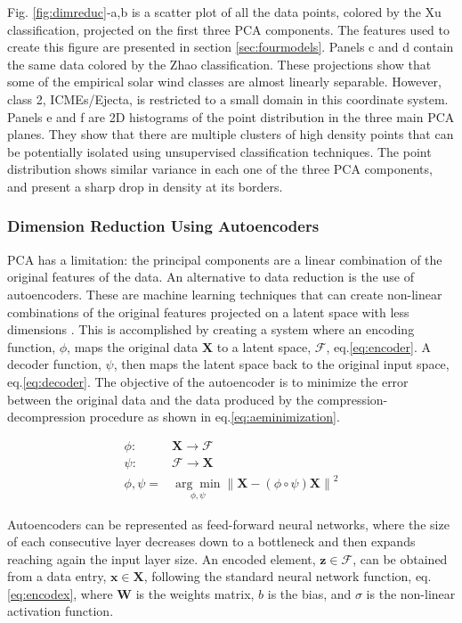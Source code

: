 Fig. \ref{fig:dimreduc}-a,b is a scatter plot of all the data points, colored by the Xu classification, projected on the first three PCA components. The features used to create this figure are presented in section \ref{sec:fourmodels}. Panels c and d contain the same data colored by the Zhao classification. These projections show that some of the empirical solar wind classes are almost linearly separable. However, class 2, ICMEs/Ejecta, is restricted to a small domain in this coordinate system. Panels e and f are 2D histograms of the point distribution in the three main PCA planes. They show that there are multiple clusters of high density points that can be potentially isolated using unsupervised classification techniques. The point distribution shows similar variance in each one of the three PCA components, and present a sharp drop in density at its borders.

\subsubsection{Dimension Reduction Using Autoencoders}
PCA has a limitation: the principal components are a linear combination of the original features of the data. An alternative to data reduction is the use of autoencoders. These are machine learning techniques that can create non-linear combinations of the original features projected on a latent space with less dimensions \citep{Hinton2006}. This is accomplished by creating a system where an encoding function, $\phi$, maps the original data $\boldsymbol{X}$ to a latent space, $\boldsymbol{\mathcal{F}}$, eq.\eqref{eq:encoder}. A decoder function, $\psi$, then maps the latent space back to the original input space, eq.\eqref{eq:decoder}. The objective of the autoencoder is to minimize the error between the original data and the data produced by the compression-decompression procedure as shown in eq.\eqref{eq:aeminimization}.

\begin{align}
\phi: & \boldsymbol{X} \rightarrow \boldsymbol{\mathcal{F}} \label{eq:encoder}\\
\psi: & \boldsymbol{\mathcal{F}} \rightarrow \boldsymbol{X} \label{eq:decoder} \\
\phi,\psi = & \underset{\phi,\psi}{\arg \min} \left\lVert \boldsymbol{X} - (\phi \circ \psi) \boldsymbol{X} \right\rVert^2 \label{eq:aeminimization}
\end{align}

Autoencoders can be represented as feed-forward neural networks, where the size of each consecutive layer decreases down to a bottleneck and then expands reaching again the input layer size. An encoded element, $\boldsymbol{z} \in \boldsymbol{\mathcal{F}}$, can be obtained from a data entry, $\boldsymbol{x} \in \boldsymbol{X}$, following the standard neural network function, eq.\eqref{eq:encodex}, where $\boldsymbol{W}$ is the weights matrix, $b$ is the bias, and $\sigma$ is the non-linear activation function.

